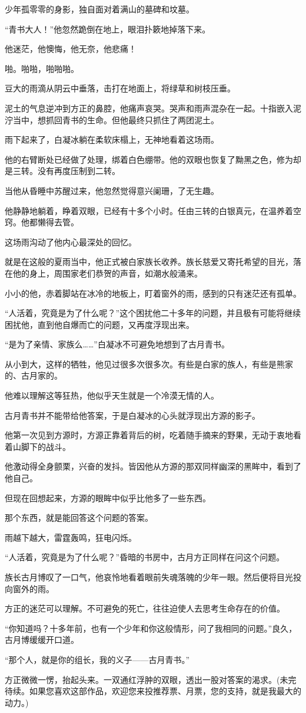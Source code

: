 \begin{this_body}
少年孤零零的身影，独自面对着满山的墓碑和坟墓。

“青书大人！”他忽然跪倒在地上，眼泪扑簌地掉落下来。

他迷茫，他懊悔，他无奈，他悲痛！

啪。啪啪，啪啪啪。

豆大的雨滴从阴云中垂落，击打在地面上，将绿草和树枝压垂。

泥土的气息逆冲到方正的鼻腔，他痛声哀哭。哭声和雨声混杂在一起。十指嵌入泥泞当中，想抓回青书的生命。但他最终只抓住了两团泥土。

雨下起来了，白凝冰躺在柔软床榻上，无神地看着这场雨。

他的右臂断处已经做了处理，绑着白色绷带。他的双眼也恢复了黝黑之色，修为却是三转。没有再度压制到二转。

当他从昏睡中苏醒过来，他忽然觉得意兴阑珊，了无生趣。

他静静地躺着，睁着双眼，已经有十多个小时。任由三转的白银真元，在温养着空窍。他都懒得去管。

这场雨沟动了他内心最深处的回忆。

就是在这般的夏雨当中，他正式被白家族长收养。族长慈爱又寄托希望的目光，落在他的身上，周围家老们恭贺的声音，如潮水般涌来。

小小的他，赤着脚站在冰冷的地板上，盯着窗外的雨，感到的只有迷茫还有孤单。

“人活着，究竟是为了什么呢？”这个困扰他二十多年的问题，并且极有可能将继续困扰他，直到他自爆而亡的问题，又再度浮现出来。

“是为了亲情、家族么……”白凝冰不可避免地想到了古月青书。

从小到大，这样的牺牲，他见过很多次很多次。有些是白家的族人，有些是熊家的、古月家的。

他难以理解这等狂热，他似乎天生就是一个冷漠无情的人。

古月青书并不能带给他答案，于是白凝冰的心头就浮现出方源的影子。

他第一次见到方源时，方源正靠着背后的树，吃着随手摘来的野果，无动于衷地看着山脚下的战斗。

他激动得全身颤栗，兴奋的发抖。皆因他从方源的那双同样幽深的黑眸中，看到了他自己。

但现在回想起来，方源的眼眸中似乎比他多了一些东西。

那个东西，就是能回答这个问题的答案。

雨越下越大，雷霆轰鸣，狂电闪烁。

“人活着，究竟是为了什么呢？”昏暗的书房中，古月方正同样在问这个问题。

族长古月博叹了一口气，他哀怜地看着眼前失魂落魄的少年一眼。然后便将目光投向窗外的雨。

方正的迷茫可以理解。不可避免的死亡，往往迫使人去思考生命存在的价值。

“你知道吗？十多年前，也有一个少年和你这般情形，问了我相同的问题。”良久，古月博缓缓开口道。

“那个人，就是你的组长，我的义子——古月青书。”

方正微微一愣，抬起头来。一双通红浮肿的双眼，透出一股对答案的渴求。(未完待续。如果您喜欢这部作品，欢迎您来投推荐票、月票，您的支持，就是我最大的动力。)

\end{this_body}

